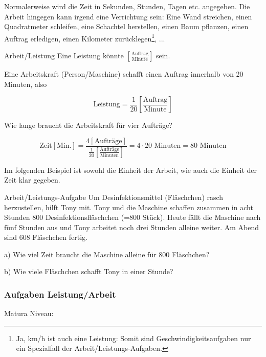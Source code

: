 Normalerweise wird die Zeit in Sekunden, Stunden, Tagen etc. angegeben. Die
Arbeit hingegen kann irgend eine Verrichtung sein: Eine Wand
streichen, einen Quadratmeter schleifen, eine Schachtel herstellen,
einen Baum pflanzen, einen Auftrag erledigen, einen Kilometer zurücklegen\footnote{Ja, km/h ist auch eine Leistung: Somit sind Geschwindigkeitsaufgaben nur ein Spezialfall der Arbeit/Leistungs-Aufgaben.}, ...

\begin{beispiel}{Arbeit/Leistung}{}
  Eine Leistung könnte  $\left[\frac{\text{Auftrag}}{\text{Minute}}\right]$ sein.

  Eine Arbeitskraft (Person/Maschine) schafft einen Auftrag innerhalb von 20 Minuten, also

  $$\text{Leistung} = \frac1{20} \left[\frac{\text{Auftrag}}{\text{Minute}}\right]$$

  Wie lange braucht die Arbeitskraft für vier Aufträge?

  $$\text{Zeit} [\text{Min.}] = \frac{4[\text{Aufträge}]}{\frac{1}{20} \left[\frac{\text{Aufträge}}{\text{Minuten}}\right]} = 4\cdot{} 20 \text{ Minuten} = 80 \text{ Minuten}$$
\end{beispiel}


\newpage

Im folgenden Beispiel ist sowohl die Einheit der Arbeit, wie auch die
Einheit der Zeit klar gegeben.

\begin{beispiel}{Arbeit/Leistungs-Aufgabe}{}
  Um Desinfektionsmittel (Fläschchen) rasch herzustellen, hilft Tony mit.
  Tony und die Maschine schaffen zusammen in acht Stunden 800
  Desinfektionsfläschchen (=800 Stück).
  Heute fällt die Maschine nach fünf Stunden aus und Tony arbeitet noch
  drei Stunden alleine weiter. Am Abend sind 608 Fläschchen fertig.

  a) Wie viel Zeit braucht die Maschine alleine für 800 Fläschchen?

  b) Wie viele Fläschchen schafft Tony in einer Stunde?
\end{beispiel}


\subsubsection*{Aufgaben Leistung/Arbeit}
Matura Niveau:

\newpage
{}%
